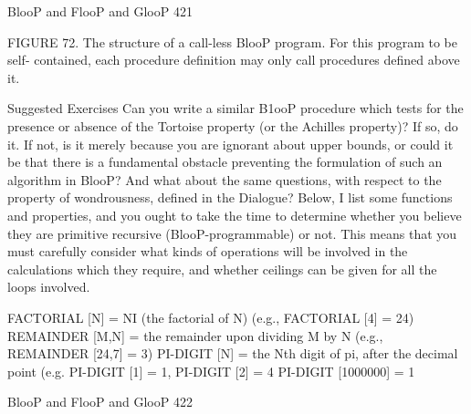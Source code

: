 BlooP and FlooP and GlooP                                                               421

FIGURE 72. The structure of a call-less BlooP program. For this program to be self-
contained, each procedure definition may only call procedures defined above it.

                                 Suggested Exercises
Can you write a similar B1ooP procedure which tests for the presence or absence of the
Tortoise property (or the Achilles property)? If so, do it. If not, is it merely because you
are ignorant about upper bounds, or could it be that there is a fundamental obstacle
preventing the formulation of such an algorithm in BlooP? And what about the same
questions, with respect to the property of wondrousness, defined in the Dialogue?
Below, I list some functions and properties, and you ought to take the time to determine
whether you believe they are primitive recursive (BlooP-programmable) or not. This
means that you must carefully consider what kinds of operations will be involved in the
calculations which they require, and whether ceilings can be given for all the loops
involved.

FACTORIAL [N] = NI (the factorial of N)
 (e.g., FACTORIAL [4] = 24)
REMAINDER [M,N] = the remainder upon dividing M by N
 (e.g., REMAINDER [24,7] = 3)
PI-DIGIT [N] = the Nth digit of pi, after the decimal point
 (e.g. PI-DIGIT [1] = 1,
        PI-DIGIT [2] = 4
        PI-DIGIT [1000000] = 1



BlooP and FlooP and GlooP                                                               422

